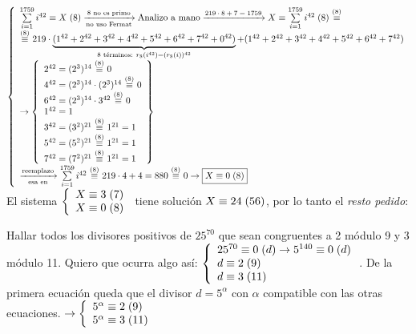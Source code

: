 \documentclass[12pt,a4paper, spanish]{article}
\begin{document}
\begin{enumerate}[label=\roman*)]
	      $\llave{l}
		      {
			      \congruencia{\sumLocal i^{42}}{X}{8}
			      \flecha{8 no es primo}[no uso Fermat]
			      \text{Analizo a mano}
			      \flecha{$219 \cdot 8 + 7 = 1759$}
			      \congruencia{X}{\sumLocal i^{42}}{8} \conga8
			      \\
			      \conga8 219 \cdot \ub{(1^{42} + 2^{42} + 3^{42} + 4^{42} + 5^{42} + 6^{42} + 7^{42} + 0^{42})}{\text{8 términos: } r_8(i^{42}) = (r_8(i))^{42} }
			      + (1^{42} + 2^{42} + 3^{42} + 4^{42} + 5^{42} + 6^{42} + 7^{42}) \\
			      \to
			      \llaves{l}{
				      2^{42} = (2^3)^{14}\conga8 0\\
				      4^{42} = (2^3)^{14} \cdot (2^3)^{14}\conga8 0\\
				      6^{42} = (2^3)^{14} \cdot 3^{42} \conga8 0\\
				      1^{42} = 1\\
				      3^{42} = (3^2)^{21} \conga8 1^{21} = 1\\
				      5^{42} = (5^2)^{21} \conga8 1^{21} = 1\\
				      7^{42} = (7^2)^{21} \conga8 1^{21} = 1
			      }\\
			      \flecha{reemplazo}[esa en]
			      \sumLocal i^{42} \conga8 219 \cdot 4 + 4  = 880 \conga8 0 \to \boxed{\congruencia{X}{0}{8}}\\
		      }$\\
	      El sistema
	      $\llave{l}{
			      \congruencia{X}{3}{7} \\
			      \congruencia{X}{0}{8} \\
		      }$ tiene solución $\congruencia{X}{24}{56}$, por lo tanto el \textit{resto pedido}: 
\end{enumerate}

\setcounter{ejercicio}{22}
\ejercicio Hallar todos los divisores positivos de $25^{70}$ que sean congruentes a 2 módulo 9 y 3 módulo 11.
\separadorCorto
Quiero que ocurra algo así:
$\llave{l}{
		\congruencia{25^{70}}{0}{d} \to \congruencia{5^{140}}{0}{d}  \\
		\congruencia{d}{2}{9} \\
		\congruencia{d}{3}{11}
	}$.
De la primera ecuación queda que el divisor $d = 5^\alpha$ con $\alpha$ compatible
con las otras ecuaciones.
$\to
	\llave{l}{
		\congruencia{5^\alpha}{2}{9} \\
		\congruencia{5^\alpha}{3}{11}
	}$\\
\end{document}

